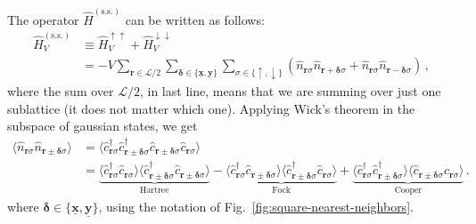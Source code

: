 The operator $\hat H^{(\mathrm{s.s.})}$ can be written as follows:
\begin{align}
	\hat H_V^{(\mathrm{s.s.})} &\equiv \hat H_V^{\uparrow\uparrow}  + \hat H_V^{\downarrow\downarrow} \nonumber \\
	&= -V \sum_{\mathbf{r} \in \mathcal{L}/2} \sum_{\bm{\delta}\in \lbrace \underline{\mathbf{x}}, \underline{\mathbf{y}} \rbrace} \sum_{\sigma \in \lbrace \uparrow, \downarrow \rbrace} \left(
	\hat n_{\mathbf{r}\sigma} \hat n_{\mathbf{r}+\bm{\delta} \sigma} + \hat n_{\mathbf{r}\sigma} \hat n_{\mathbf{r}-\bm{\delta}\sigma}
	\right) \, , \label{eq:ehm-HV(ss)}
\end{align}
where the sum over $\mathcal{L}/2$, in last line, means that we are summing over just one sublattice (it does not matter which one). Applying Wick's theorem in the subspace of gaussian states, we get
\begin{align}
	\langle 
	\hat n_{\mathbf{r}\sigma} \hat n_{\mathbf{r} \pm \bm{\delta} \sigma}
	\rangle &= \langle
	\hat c_{\mathbf{r}\sigma}^\dagger \hat c_{\mathbf{r} \pm \bm{\delta} \sigma}^\dagger \hat c_{\mathbf{r} \pm \bm{\delta} \sigma} \hat c_{\mathbf{r}\sigma}
	\rangle \nonumber \\
	&=
	\underbrace{
		\langle 
		\hat c_{\mathbf{r}\sigma}^\dagger \hat c_{\mathbf{r}\sigma}
		\rangle \langle	
		\hat c_{\mathbf{r} \pm \bm{\delta} \sigma}^\dagger \hat c_{\mathbf{r} \pm \bm{\delta} \sigma}
		\rangle
	}_{\text{Hartree}}
	- 
	\underbrace{
		\langle 
		\hat c_{\mathbf{r}\sigma}^\dagger \hat c_{\mathbf{r} \pm \bm{\delta} \sigma}
		\rangle \langle	
		\hat c_{\mathbf{r} \pm \bm{\delta} \sigma}^\dagger \hat c_{\mathbf{r}\sigma}
		\rangle 
	}_{\text{Fock}}
	+
	\underbrace{
		\langle 
		\hat c_{\mathbf{r}\sigma}^\dagger \hat c_{\mathbf{r} \pm \bm{\delta} \sigma}^\dagger
		\rangle \langle	
		\hat c_{\mathbf{r} \pm \bm{\delta} \sigma} \hat c_{\mathbf{r}\sigma}
		\rangle 
	}_{\text{Cooper}}	
	\label{eq:ehm-HV(ss)-wick} \, .
\end{align}
where $\bm{\delta} \in \lbrace \underline{\mathbf{x}}, \underline{\mathbf{y}} \rbrace$, using the notation of Fig.~\ref{fig:square-nearest-neighbors}.

